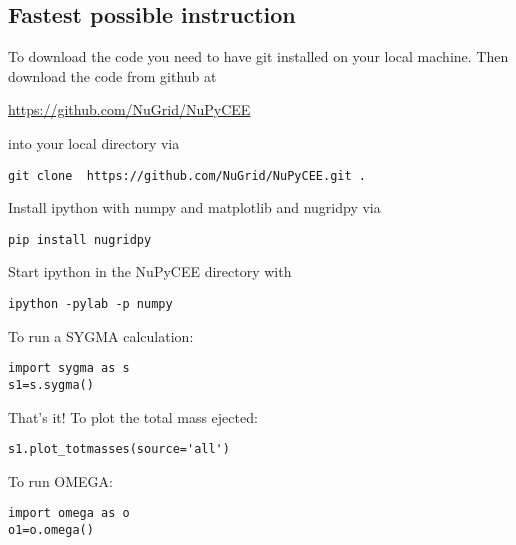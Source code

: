 
\subsection{Fastest possible instruction}

To download the code
you need to have git installed on your local machine.
Then download the code from github at

\url{https://github.com/NuGrid/NuPyCEE}

into your local directory via

\begin{verbatim}
git clone  https://github.com/NuGrid/NuPyCEE.git .
\end{verbatim}

Install ipython with numpy and matplotlib and
nugridpy via

\begin{verbatim}
pip install nugridpy
\end{verbatim}

Start ipython in the NuPyCEE directory with

\begin{verbatim}
ipython -pylab -p numpy
\end{verbatim}

To run a SYGMA calculation:

\begin{verbatim}
import sygma as s
s1=s.sygma()
\end{verbatim}

That's it! To plot the total  mass ejected:

\begin{verbatim}
s1.plot_totmasses(source='all')	
\end{verbatim}


To run OMEGA:

\begin{verbatim}
import omega as o
o1=o.omega()
\end{verbatim}

